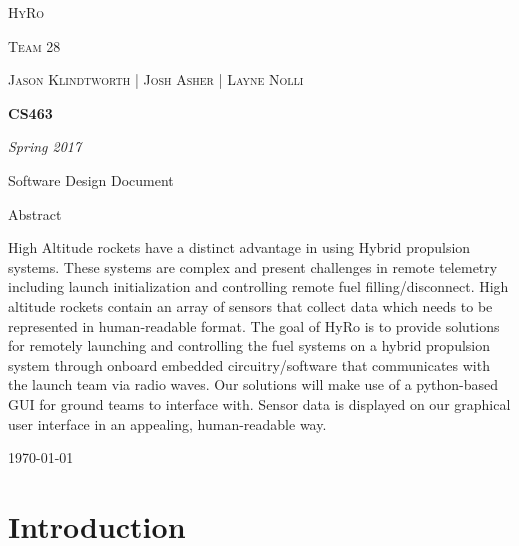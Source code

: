 \documentclass[10pt,draftclsnofoot,onecolumn,compsoc]{IEEEtran}
\begin{document}
\begin{titlepage}
	\centering
	{\scshape\LARGE HyRo \par}
	{\scshape\LARGE Team 28\par}
	\vspace{1cm}
	{\scshape\Large Jason Klindtworth  |  Josh Asher  |   Layne Nolli}
	\noindent\makebox[\linewidth]{\rule{17cm}{2pt}}
	\vspace{1cm}
	{\huge\bfseries CS463\par}
	\vspace{2cm}
	{\Large\itshape Spring 2017\par}
	\vspace{4cm}
	{\large Software Design Document\par}\vspace{2cm}
	{\large Abstract\par}
	\vspace{1cm}
	High Altitude rockets have a distinct advantage in using Hybrid propulsion systems. These systems are complex and present challenges in remote telemetry including launch initialization and controlling remote fuel filling/disconnect. High altitude rockets contain an array of sensors that collect data which needs to be represented in human-readable format. The goal of HyRo is to provide solutions for remotely launching and controlling the fuel systems on a hybrid propulsion system through onboard embedded circuitry/software that communicates with the launch team via radio waves. Our solutions will make use of a python-based GUI for ground teams to interface with. Sensor data is displayed on our graphical user interface in an appealing, human-readable way. \par

	\noindent\makebox[\linewidth]{\rule{17cm}{2pt}}
	\vfill

	{\large \today\par}
\end{titlepage}


\setcounter{tocdepth}{2}
\tableofcontents
\newpage

\section{Introduction}
\end{document}
